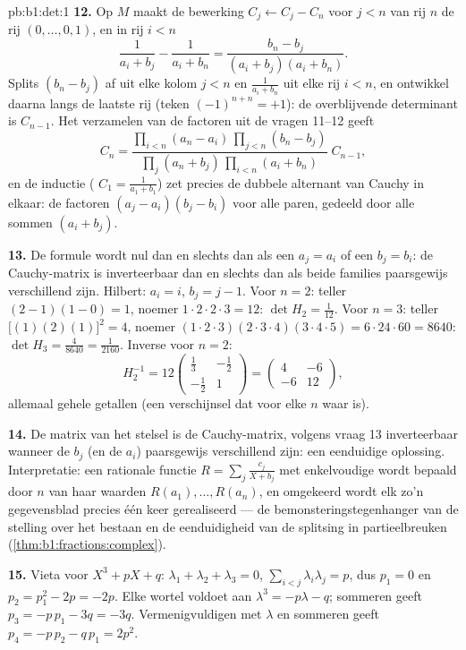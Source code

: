 \begin{solution}{pb:b1:det:1}
\textbf{12.} Op $M$ maakt de bewerking $C_j \leftarrow C_j - C_n$
voor $j < n$ van rij $n$ de rij $(0, \dots, 0, 1)$, en in rij $i <
n$
\[
\frac{1}{a_i + b_j} - \frac{1}{a_i + b_n}
= \frac{b_n - b_j}{(a_i + b_j)(a_i + b_n)} .
\]
Splits $(b_n - b_j)$ af uit elke kolom $j < n$ en $\frac1{a_i +
b_n}$ uit elke rij $i < n$, en ontwikkel daarna langs de laatste rij
(teken $(-1)^{n+n} = +1$): de overblijvende determinant is
$C_{n-1}$. Het verzamelen van de factoren uit de vragen 11--12
geeft
\[
C_n = \frac{\prod_{i<n}(a_n - a_i)\,\prod_{j<n}(b_n - b_j)}
{\prod_{j}(a_n + b_j)\,\prod_{i<n}(a_i + b_n)}\;C_{n-1},
\]
en de inductie ( $C_1 = \frac1{a_1+b_1}$) zet precies de
dubbele alternant van Cauchy in elkaar: de factoren $(a_j -
a_i)(b_j - b_i)$ voor alle paren, gedeeld door alle sommen $(a_i +
b_j)$.

\textbf{13.} De formule wordt nul dan en slechts dan als een $a_j =
a_i$ of een $b_j = b_i$: de Cauchy-matrix is inverteerbaar dan en
slechts dan als beide families paarsgewijs verschillend zijn.
Hilbert: $a_i = i$, $b_j = j - 1$. Voor $n = 2$: teller $(2-1)(1-0)
= 1$, noemer $1\cdot2\cdot2\cdot3 = 12$: $\det H_2 = \frac1{12}$.
Voor $n = 3$: teller $\bigl[(1)(2)(1)\bigr]^2 = 4$, noemer
$(1\cdot2\cdot3)(2\cdot3\cdot4)(3\cdot4\cdot5) = 6\cdot24\cdot60 =
8640$: $\det H_3 = \frac{4}{8640} = \frac1{2160}$. Inverse voor $n =
2$:
\[
H_2^{-1} = 12\begin{pmatrix} \frac13 & -\frac12\\[2pt]
-\frac12 & 1\end{pmatrix}
= \begin{pmatrix} 4 & -6\\ -6 & 12 \end{pmatrix},
\]
allemaal gehele getallen (een verschijnsel dat voor elke $n$ waar
is).

\textbf{14.} De matrix van het stelsel is de Cauchy-matrix, volgens
vraag 13 inverteerbaar wanneer de $b_j$ (en de $a_i$) paarsgewijs
verschillend zijn: een eenduidige oplossing. Interpretatie: een
rationale functie $R = \sum_j \frac{c_j}{X + b_j}$ met
enkelvoudige  wordt bepaald door $n$ van haar waarden
$R(a_1), \dots, R(a_n)$, en omgekeerd wordt elk zo'n gegevensblad
precies één keer gerealiseerd --- de bemonsteringstegenhanger van
de stelling over het bestaan en de eenduidigheid van de splitsing
in partieelbreuken (\cref{thm:b1:fractions:complex}).

\textbf{15.} Vieta voor $X^3 + pX + q$: $\lambda_1 + \lambda_2 +
\lambda_3 = 0$, $\sum_{i<j}\lambda_i\lambda_j = p$, dus $p_1 = 0$
en $p_2 = p_1^2 - 2p = -2p$. Elke wortel voldoet aan $\lambda^3 =
-p\lambda - q$; sommeren geeft $p_3 = -p\,p_1 - 3q = -3q$.
Vermenigvuldigen met $\lambda$ en sommeren geeft $p_4 = -p\,p_2 -
q\,p_1 = 2p^2$.


\end{solution}
